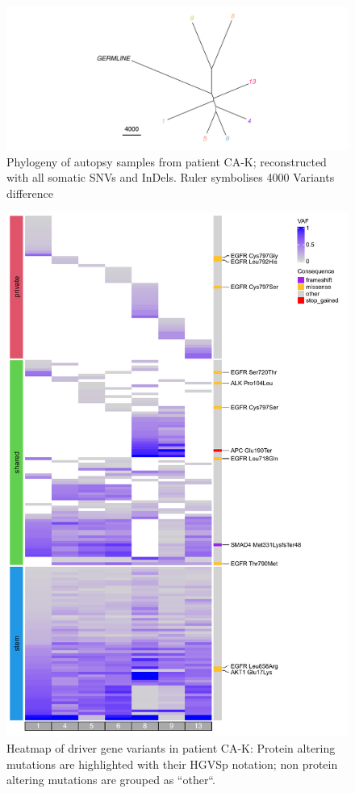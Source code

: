 \begin{figure}[ht]
	\centering
	\includegraphics[width=.99\linewidth]{Figures/CASCADE/CA82/CA82phylo.pdf}
	\caption[Phylogeny of autopsy samples from patient CA-K]{Phylogeny of autopsy samples from patient CA-K; reconstructed with all somatic SNVs and InDels. Ruler symbolises 4000 Variants difference} \label{fig:ca82phylo}
\end{figure}


\begin{figure}[ht]
\centering
\includegraphics[width=.99\linewidth]{Figures/CASCADE/CA82/CA82varHeatmap.pdf}
\caption[Heatmap of driver gene variants in patient CA-K]{Heatmap of driver gene variants in patient CA-K: Protein altering mutations are highlighted with their HGVSp notation; non protein altering mutations are grouped as ``other``.} \label{fig:ca82heatmap}
\end{figure}


